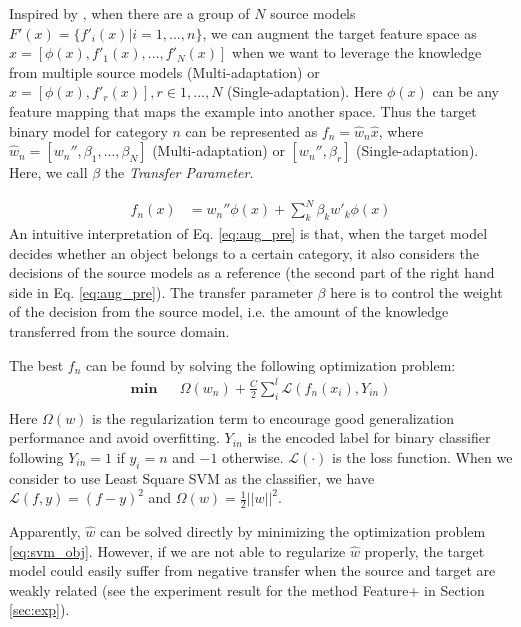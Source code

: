 Inspired by \cite{vapnik2015learning}, when there are a group of $N$ source models $F'(x)=\{f'_i(x)|i=1,...,n\}$, we can augment the target feature space as  $\hat{x}=[\phi(x),f'_1(x),...,f'_N(x)]$ when we want to leverage the knowledge from multiple source models (Multi-adaptation) or $\hat{x}=[\phi(x),f'_r(x)], r\in 1,...,N$ (Single-adaptation). Here $\phi(x)$ can be any feature mapping that maps the example into another space. Thus the target binary model for category $n$ can be represented as $f_n=\hat{w}_n\hat{x}$, where $\hat{w}_n=[w_{n}'',\beta_1,...,\beta_N]$ (Multi-adaptation) or $[w_{n}'',\beta_r]$ (Single-adaptation). Here, we call $\beta$ the \textit{Transfer Parameter}.

\begin{equation}\label{eq:aug_pre}
\begin{aligned}
f_n(x)&=w_{n}''\phi(x)+\sum\limits_k^N{\beta _kw'_k\phi(x)}
\end{aligned}
\end{equation}
An intuitive interpretation of Eq. \eqref{eq:aug_pre} is that, when the target model decides whether an object belongs to a certain category, it also considers the decisions of the source models as a reference (the second part of the right hand side in Eq. \eqref{eq:aug_pre}). The transfer parameter $\beta$ here is to control the weight of the decision from the source model, i.e. the amount of the knowledge transferred from the source domain.

The best $f_n$ can be found by solving the following optimization problem:
\begin{equation}\label{eq:svm_obj}
\begin{aligned}
\textbf{min} && \Omega({w}_n) + \frac{C}{2}\sum\limits_i^l {\mathcal{L}(f_n(x_i),Y_{in})} \\
\end{aligned}
\end{equation}
Here $\Omega({w})$ is the regularization term to encourage good generalization performance and avoid overfitting. $Y_{in}$ is the encoded label for binary classifier following $Y_{in}=1$ if $y_i=n$ and $-1$ otherwise. $\mathcal{L}(\cdot)$ is the loss function. When we consider to use Least Square SVM as the classifier, we have $\mathcal{L}(f,y) = (f-y)^2$ and $\Omega({w}) = \frac{1}{2}||w||^2$. 

Apparently, $\hat{w}$ can be solved directly by minimizing the optimization problem \eqref{eq:svm_obj}. However, if we are not able to regularize $\hat{w}$ properly, the target model could easily suffer from negative transfer when the source and target are weakly related (see the experiment result for the method Feature+ in Section \ref{sec:exp}).  


